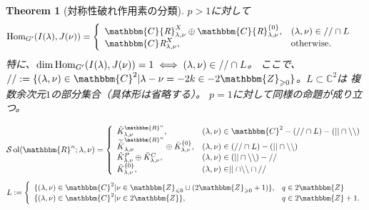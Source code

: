 \documentclass[12pt]{msjproc} %
\newcommand{\assign}{:=}
\newcommand{\tmop}[1]{\ensuremath{\operatorname{#1}}}
\newtheorem{theorem}{Theorem}
\newcommand{\Hom}{\mbox{\normalfont Hom}}
\theoremstyle{definition}
\theoremstyle{exampstyle} \newtheorem{examp}[theorem]{Theorem}
\newcommand{\OpR}{\mbox{\it R}}
\begin{document}
\begin{theorem}[対称性破れ作用素の分類]
  $p > 1$に対して
  \begin{eqnarray}
	  & \Hom_{G'}(I(\lambda),J(\nu))= \left\{
    \begin{array}{ll}
      \mathbbm{C} {\OpR}_{\lambda, \nu}^{X} \oplus \mathbbm{C}
      {\OpR}^{\{ 0 \}}_{\lambda, \nu}, & (\lambda, \nu) \in / /\cap 
      L\\
      \mathbbm{C} \OpR^X_{\lambda, \nu}, &
      \mbox{\normalfont otherwise.}
    \end{array} \right. &  \nonumber
  \end{eqnarray}
  特に、$\dim\Hom_{G'}(I(\lambda),J(\nu))=1\iff(\lambda,\nu)\in//\cap L$。
  ここで、$//\assign \{ (\lambda, \nu) \in \mathbbm{C}^2 |
  \lambda - \nu = - 2 k \in - 2\mathbbm{Z}_{\geqslant 0} \}$。$L\subset\mathbb{C}^2$は
  複数余次元$1$の部分集合（具体形は省略する）。
  $p=1$に対して同様の命題が成り立つ。
\begin{versiona}
\[ \mathcal{S} \tmop{ol} (\mathbbm{R}^n ; \lambda, \nu) = \left\{
   \begin{array}{ll}
     \tilde{K}_{\lambda, \nu}^{\mathbbm{R}^n}, & (\lambda, \nu) \in
     \mathbbm{C}^2 - (/ / \cap L) - (| | \cap \backslash\backslash)\\
     \widetilde{\tilde{K}}_{\lambda, \nu}^{\mathbbm{R}^n} \oplus \tilde{K}^{\{
     0 \}}_{\lambda, \nu}, & (\lambda, \nu) \in (/ / \cap L) - (| | \cap
     \backslash\backslash)\\
     \tilde{K}_{\lambda, \nu}^P \oplus \tilde{K}_{\lambda, \nu}^C, & (\lambda,
     \nu) \in (| | \cap \backslash\backslash) - / /\\
     \tilde{K}^{\{ 0 \}}_{\lambda, \nu}, & (\lambda, \nu) \in \mid
     \mid \cap \backslash\backslash \cap / /
   \end{array} \right. \]
\[ L \assign \left\{ \begin{array}{ll}
     \{ (\lambda, \nu) \in \mathbbm{C}^2 | \nu \in \mathbbm{Z}_{\leqslant 0}
     \cup (2\mathbbm{Z}_{\geqslant 0} + 1) \}, & q \in 2\mathbbm{Z}\\
     \{ (\lambda, \nu) \in \mathbbm{C}^2 | \nu \in 2\mathbbm{Z} \}, & q \in
     2\mathbbm{Z}+ 1.
   \end{array} \right. \]
\end{versiona}
\end{theorem}
\end{document}
